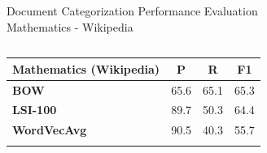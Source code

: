 \documentclass[10pt]{beamer}
\begin{document}
\begin{frame}{Document Categorization Performance Evaluation \\ Mathematics - Wikipedia }
\begin{columns}[T]
	\hspace{5mm}
	\begin{column}{.4\textwidth}
		\begin{table}[h!]
	\tabcolsep=0.1cm
	\scriptsize
	\begin{center}
	\begin{tabular}{l@{\hskip3mm} c c@{\hskip4mm} c}
	\toprule
	\textbf{Mathematics (Wikipedia)} & {P} & {R} & \textbf{F1} \\
	\midrule
	\textbf{BOW}
	& 65.6   & 65.1  & 65.3 \\
	\textbf{LSI-100}
	& 89.7   & 50.3  & 64.4 \\
	\textbf{WordVecAvg}
	& 90.5   & 40.3  & 55.7 \\ \addlinespace[1mm]


\end{tabular}
\end{center}
\end{table}
\end{column}
\end{columns}
\end{frame}
\end{document}
